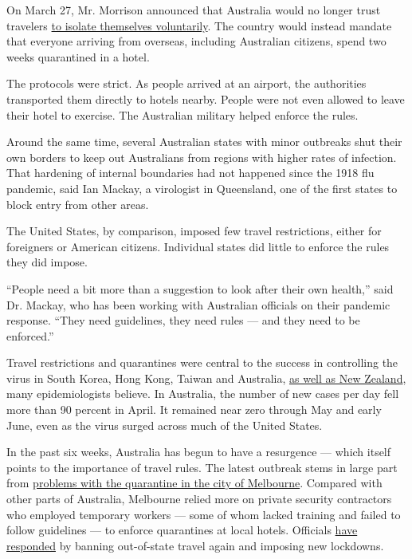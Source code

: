 On March 27, Mr. Morrison announced that Australia would no longer trust
travelers
\href{https://www.abc.net.au/news/2020-03-27/pm-announces-new-quarantine-measures-international-travellers/12097390?nw=0}{to
isolate themselves voluntarily}. The country would instead mandate that
everyone arriving from overseas, including Australian citizens, spend
two weeks quarantined in a hotel.

The protocols were strict. As people arrived at an airport, the
authorities transported them directly to hotels nearby. People were not
even allowed to leave their hotel to exercise. The Australian military
helped enforce the rules.

Around the same time, several Australian states with minor outbreaks
shut their own borders to keep out Australians from regions with higher
rates of infection. That hardening of internal boundaries had not
happened since the 1918 flu pandemic, said Ian Mackay, a virologist in
Queensland, one of the first states to block entry from other areas.

The United States, by comparison, imposed few travel restrictions,
either for foreigners or American citizens. Individual states did little
to enforce the rules they did impose.

``People need a bit more than a suggestion to look after their own
health,'' said Dr. Mackay, who has been working with Australian
officials on their pandemic response. ``They need guidelines, they need
rules --- and they need to be enforced.''

Travel restrictions and quarantines were central to the success in
controlling the virus in South Korea, Hong Kong, Taiwan and Australia,
\href{https://www.nytimes.com/2020/04/24/world/australia/new-zealand-coronavirus.html}{as
well as New Zealand}, many epidemiologists believe. In Australia, the
number of new cases per day fell more than 90 percent in April. It
remained near zero through May and early June, even as the virus surged
across much of the United States.

In the past six weeks, Australia has begun to have a resurgence ---
which itself points to the importance of travel rules. The latest
outbreak stems in large part from
\href{https://www.theage.com.au/national/victoria/how-hotel-quarantine-let-covid-19-out-of-the-bag-in-victoria-20200703-p558og.html}{problems
with the quarantine in the city of Melbourne}. Compared with other parts
of Australia, Melbourne relied more on private security contractors who
employed temporary workers --- some of whom lacked training and failed
to follow guidelines --- to enforce quarantines at local hotels.
Officials
\href{https://www.smh.com.au/national/victoria/numbers-are-too-high-melbourne-faces-stage-four-lockdown-within-days-20200801-p55hm3.html}{have
responded} by banning out-of-state travel again and imposing new
lockdowns.

